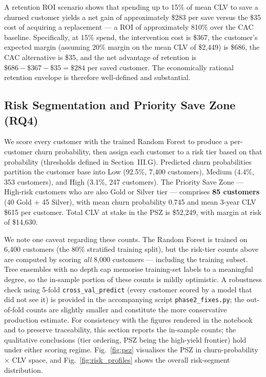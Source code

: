 \documentclass[conference]{IEEEtran}
\begin{document}
A retention ROI scenario shows that spending up to 15\% of mean CLV to save a churned customer yields a net gain of approximately \$283 per save versus the \$35 cost of acquiring a replacement — a ROI of approximately 810\% over the CAC baseline. Specifically, at 15\% spend, the intervention cost is \$367, the customer's expected margin (assuming 20\% margin on the mean CLV of \$2{,}449) is \$686, the CAC alternative is \$35, and the net advantage of retention is $\$686 - \$367 - \$35 = \$284$ per saved customer. The economically rational retention envelope is therefore well-defined and substantial.

\subsection{Risk Segmentation and Priority Save Zone (RQ4)}
\label{sec:psz}

We score every customer with the trained Random Forest to produce a per-customer churn probability, then assign each customer to a risk tier based on that probability (thresholds defined in Section~III.G). Predicted churn probabilities partition the customer base into Low (92.5\%, 7{,}400 customers), Medium (4.4\%, 353 customers), and High (3.1\%, 247 customers). The Priority Save Zone — High-risk customers who are also Gold or Silver tier — comprises \textbf{85 customers} (40 Gold + 45 Silver), with mean churn probability 0.745 and mean 3-year CLV \$615 per customer. Total CLV at stake in the PSZ is \$52{,}249, with margin at risk of \$14{,}630.

We note one caveat regarding these counts. The Random Forest is trained on 6{,}400 customers (the 80\% stratified training split), but the risk-tier counts above are computed by scoring \emph{all} 8{,}000 customers — including the training subset. Tree ensembles with no depth cap memorise training-set labels to a meaningful degree, so the in-sample portion of these counts is mildly optimistic. A robustness check using 5-fold \texttt{cross\_val\_predict} (every customer scored by a model that did not see it) is provided in the accompanying script \texttt{phase2\_fixes.py}; the out-of-fold counts are slightly smaller and constitute the more conservative production estimate. For consistency with the figures rendered in the notebook and to preserve traceability, this section reports the in-sample counts; the qualitative conclusions (tier ordering, PSZ being the high-yield frontier) hold under either scoring regime. Fig.~\ref{fig:psz} visualises the PSZ in churn-probability $\times$ CLV space, and Fig.~\ref{fig:risk_profiles} shows the overall risk-segment distribution.
\end{document}
